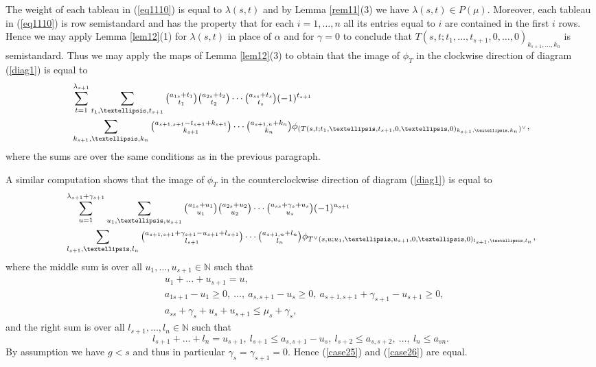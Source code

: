 \documentclass[11pt]{article}
\theoremstyle{definition}
\numberwithin{equation}{section}
\newcommand{\al}{\alpha}
\newcommand{\la}{\lambda}
\numberwithin{equation}{section}
\begin{document}
	The weight of each tableau in (\ref{eq1110}) is equal to $\la(s,t)$ and by Lemma \ref{rem11}(3) we have $\la(s,t) \in P(\mu)$. Moreover, each tableau in (\ref{eq1110}) is row semistandard and has the property that for each $i=1,\dots,n$ all its entries equal to $i$ are contained in the first $i$ rows.  Hence we may apply Lemma \ref{lem12}(1) for $\la(s,t)$ in place of $\al$ and for $\gamma=0$ to conclude that $T(s,t;t_1,\dots,t_{s+1},0,\dots,0)_{k_{s+1},\dots,k_n}$ is semistandard. Thus we may apply the maps of Lemma \ref{lem12}(3) to obtain that the image of $\phi_T$ in the clockwise direction of diagram (\ref{diag1}) is equal to 
	\begin{align}\label{case25}
		&\sum_{t=1}^{\lambda_{s+1}}\sum_{\substack{t_1,\dots,t_{s+1}}}\tbinom{a_{1s}+t_1}{t_1}\tbinom{a_{2s}+t_2}{t_2} \cdots \tbinom{a_{ss}+t_s}{t_s}(-1)^{t_{s+1}}\\& \sum_{k_{s+1},\dots,k_n}\tbinom{a_{s+1,s+1}-t_{s+1}+k_{s+1}}{k_{s+1}}\cdots\tbinom{a_{s+1,n}+k_n}{k_n}\phi_{(T(s,t;t_1,\dots,t_{s+1},0,\dots,0)_{k_{s+1},\dots,k_n})^{\vee}}\nonumber,
	\end{align} where the sums are over the same conditions as in the previous paragraph.
	
A similar computation shows that the image of $\phi_T$ in the counterclockwise direction of diagram (\ref{diag1}) is equal to \begin{align}\label{case26}
	&\sum_{u=1}^{\lambda_{s+1}+\gamma_{s+1}}\sum_{u_1,\dots,u_{s+1}}\tbinom{a_{1s}+u_1}{u_1}\tbinom{a_{2s}+u_2}{u_2} \cdots \tbinom{a_{ss} + \gamma_s + u_s}{u_s}(-1)^{u_{s+1}}\\& \sum_{l_{s+1},\dots,l_n}\tbinom{a_{s+1,s+1}+\gamma_{s+1}-u_{s+1}+l_{s+1}}{l_{s+1}}\cdots\tbinom{a_{s+1,n}+l_n}{l_n}\phi_{T^{\vee}(s,u;u_1,\dots,u_{s+1},0,\dots,0)_{l_{s+1},\dots,l_n}}\nonumber,
\end{align} where the middle sum is over all  $u_1,\dots,u_{s+1} \in \mathbb{N}$ such that \begin{align}\label{case27}&u_{1}+\dots+u_{s+1}=u,\\\label{case28}&a_{1s+1}-u_1 \ge 0, \ \dots, \ a_{s,s+1}-u_{s} \ge 0, \ a_{s+1,s+1}+\gamma_{s+1}-u_{s+1} \ge 0, \\\label{case29}&a_{ss} + \gamma_s +u_s+u_{s+1}  \le \mu_s +\gamma_s,\end{align}
and the right sum is over all 
$l_{s+1},\dots, l_n \in \mathbb{N}$ such that \begin{equation}\label{case211}l_{s+1}+\dots+l_n=u_{s+1}, \  l_{s+1} \le a_{s,s+1}-u_s, \  l_{s+2} \le a_{s,s+2}, \  \dots, \  l_n \le a_{sn}.\end{equation} 
By assumption we have $g<s$ and thus in particular $\gamma_s = \gamma_{s+1}=0$. Hence (\ref{case25}) and (\ref{case26}) are equal.
\end{document}
